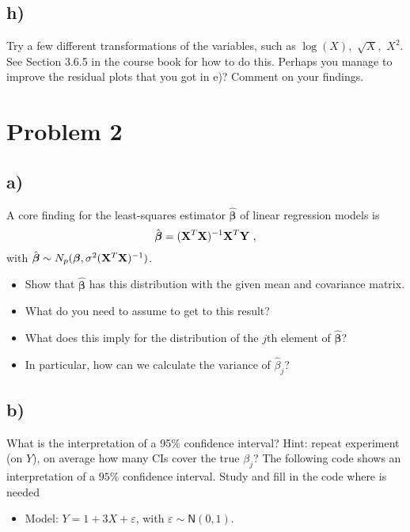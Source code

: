 \documentclass[
]{article}
\providecommand{\tightlist}{%
  \setlength{\itemsep}{0pt}\setlength{\parskip}{0pt}}
\begin{document}
\subsection{h)}\label{h}

Try a few different transformations of the variables, such as
\(\log(X),\) \(\sqrt{X},\) \(X^2\). See Section 3.6.5 in the course book
for how to do this. Perhaps you manage to improve the residual plots
that you got in e)? Comment on your findings.

\section{Problem 2}\label{problem-2}

\subsection{a)}\label{a-1}

A core finding for the least-squares estimator
\(\hat{\boldsymbol\beta}\) of linear regression models is
\[ \hat{\boldsymbol\beta} = ({\bf X}^T{\bf X})^{-1} {\bf X}^T {\bf Y} \ , \]
with
\(\hat{\boldsymbol\beta}\sim N_{p}(\boldsymbol\beta,\sigma^2({\bf X}^T{\bf X})^{-1})\).

\begin{itemize}
\tightlist
\item
  Show that \(\hat{\boldsymbol\beta}\) has this distribution with the
  given mean and covariance matrix.
\item
  What do you need to assume to get to this result?
\item
  What does this imply for the distribution of the \(j\)th element of
  \(\hat{\boldsymbol\beta}\)?
\item
  In particular, how can we calculate the variance of \(\hat{\beta}_j\)?
\end{itemize}

\subsection{b)}\label{b-1}

What is the interpretation of a 95\% confidence interval? Hint: repeat
experiment (on \(Y\)), on average how many CIs cover the true
\(\beta_j\)? The following code shows an interpretation of a \(95\%\)
confidence interval. Study and fill in the code where is needed

\begin{itemize}
\tightlist
\item
  Model: \(Y = 1 + 3X + \varepsilon\), with
  \(\varepsilon \sim \mathsf{N}(0,1)\).
\end{itemize}
\end{document}
